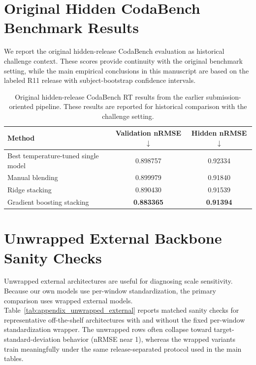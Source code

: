 \documentclass[12pt]{article}
\begin{document}
\section{Original Hidden CodaBench Benchmark Results}

We report the original hidden-release CodaBench evaluation as historical challenge context. These scores provide continuity with the original benchmark setting, while the main empirical conclusions in this manuscript are based on the labeled R11 release with subject-bootstrap confidence intervals.

\begin{table}[!h]
\centering
\caption{Original hidden-release CodaBench RT results from the earlier submission-oriented pipeline. These results are reported for historical comparison with the challenge setting.}
\label{tab:appendix_codabench}
\small
\setlength{\tabcolsep}{8pt}
\renewcommand{\arraystretch}{1.15}
\begin{tabular}{lcc}
\toprule
\textbf{Method} & \textbf{Validation nRMSE} $\downarrow$ & \textbf{Hidden nRMSE} $\downarrow$ \\
\midrule
Best temperature-tuned single model & 0.898757 & 0.92334 \\
Manual blending & 0.899979 & 0.91840 \\
Ridge stacking & 0.890430 & 0.91539 \\
Gradient boosting stacking & \textbf{0.883365} & \textbf{0.91394} \\
\bottomrule
\end{tabular}
\end{table}

\section{Unwrapped External Backbone Sanity Checks}

Unwrapped external architectures are useful for diagnosing scale sensitivity. Because our own models use per-window standardization, the primary comparison uses wrapped external models. Table~\ref{tab:appendix_unwrapped_external} reports matched sanity checks for representative off-the-shelf architectures with and without the fixed per-window standardization wrapper. The unwrapped rows often collapse toward target-standard-deviation behavior (nRMSE near 1), whereas the wrapped variants train meaningfully under the same release-separated protocol used in the main tables.
\end{document}
